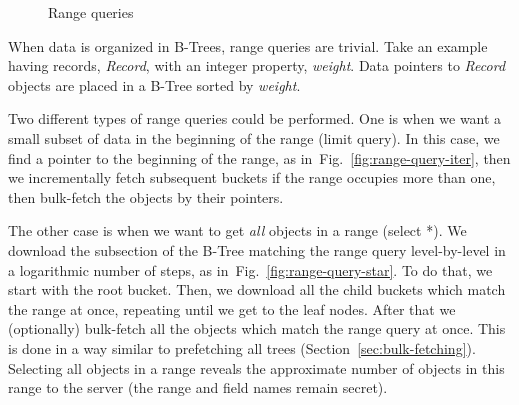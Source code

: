\documentclass[notitlepage,longbibliography]{revtex4-1}
\newcommand{\figref}[1]{Fig.~\ref{#1}}
\begin{document}
\begin{figure}
	\begin{center}
        \qquad
	\end{center}
	\caption{Range queries}
	\label{fig:range-query}
\end{figure}

When data is organized in B-Trees, range queries are trivial.
Take an example having records, \emph{Record}, with an integer property, \emph{weight}.
Data pointers to \emph{Record} objects are placed in a B-Tree sorted by \emph{weight}.

Two different types of range queries could be performed.
One is when we want a small subset of data in the beginning of the range (limit query).
In this case, we find a pointer to the beginning of the range, as in~\figref{fig:range-query-iter}, then we incrementally fetch subsequent buckets if the range occupies more than one, then bulk-fetch the objects by their pointers.

The other case is when we want to get \emph{all} objects in a range (select *).
We download the subsection of the B-Tree matching the range query level-by-level in a logarithmic number of steps, as in~\figref{fig:range-query-star}.
To do that, we start with the root bucket.
Then, we download all the child buckets which match the range at once, repeating until we get to the leaf nodes.
After that we (optionally) bulk-fetch all the objects which match the range query at once.
This is done in a way similar to prefetching all trees (Section~\ref{sec:bulk-fetching}).
Selecting all objects in a range reveals the approximate number of objects in this range to the server (the range and field names remain secret).
\end{document}

